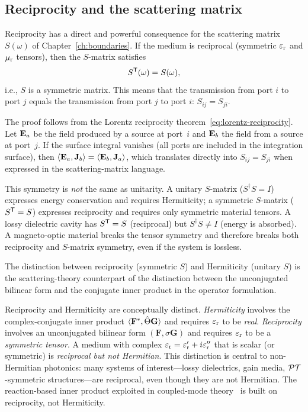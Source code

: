 \subsection{Reciprocity and the scattering matrix}
\label{ssec:reciprocity-smatrix}

Reciprocity has a direct and powerful consequence for the scattering
matrix $S(\omega)$ of Chapter~\ref{ch:boundaries}. If the medium is
reciprocal (symmetric $\varepsilon_{\mathrm{r}}$ and $\mu_{\mathrm{r}}$ tensors), then the $S$-matrix
satisfies
\begin{equation}
 S^{\mathsf{T}}(\omega) = S(\omega),
 \label{eq:s-reciprocity}
\end{equation}
i.e., $S$ is a symmetric matrix. This means that the transmission from
port $i$ to port $j$ equals the transmission from port $j$ to port $i$:
$S_{ij} = S_{ji}$.

The proof follows from the Lorentz reciprocity
theorem~\eqref{eq:lorentz-reciprocity}. Let $\mathbf{E}_a$ be the field
produced by a source at port~$i$ and $\mathbf{E}_b$ the field from a source at
port~$j$. If the surface integral vanishes (all ports are included in
the integration surface), then
$\langle\mathbf{E}_a,\mathbf{J}_b\rangle = \langle\mathbf{E}_b,\mathbf{J}_a\rangle$, which
translates directly into $S_{ij} = S_{ji}$ when expressed in the
scattering-matrix language.

This symmetry is \emph{not} the same as unitarity. A unitary $S$-matrix
($S^\dagger S = I$) expresses energy conservation and requires
Hermiticity; a symmetric $S$-matrix ($S^{\mathsf{T}} = S$) expresses
reciprocity and requires only symmetric material tensors. A lossy
dielectric cavity has $S^{\mathsf{T}} = S$ (reciprocal) but
$S^\dagger S \neq I$ (energy is absorbed). A magneto-optic material
breaks the tensor symmetry and therefore breaks both reciprocity and
$S$-matrix symmetry, even if the system is lossless.

The distinction between reciprocity (symmetric $S$) and Hermiticity
(unitary $S$) is the scattering-theory counterpart of the distinction
between the unconjugated bilinear form and the conjugate inner product
in the operator formulation.

\begin{booknote}
Reciprocity and Hermiticity are conceptually distinct.
\emph{Hermiticity} involves the complex-conjugate inner product
$\langle\mathbf{F}^*,\hat{\Theta}\mathbf{G}\rangle$ and requires $\varepsilon_{\mathrm{r}}$ to be
\emph{real}. \emph{Reciprocity} involves an unconjugated bilinear form
$(\mathbf{F},\sigma\mathbf{G})$ and requires $\varepsilon_{\mathrm{r}}$ to be a
\emph{symmetric tensor}. A medium with complex $\varepsilon_{\mathrm{r}} = \varepsilon_{\mathrm{r}}' + i\varepsilon_{\mathrm{r}}''$
that is scalar (or symmetric) is \emph{reciprocal but not Hermitian}.
This distinction is central to non-Hermitian photonics: many systems of
interest---lossy dielectrics, gain media, $\mathcal{PT}$-symmetric
structures---are reciprocal, even though they are not Hermitian.
The reaction-based inner product exploited in coupled-mode
theory~\cite{xu2015general} is built on reciprocity, not Hermiticity.
\end{booknote}


